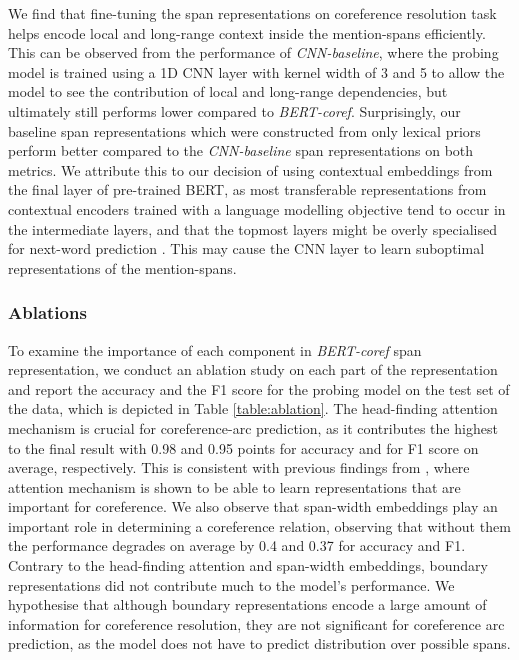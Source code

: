 \documentclass[11pt]{article}
\begin{document}
We find that fine-tuning the span representations on coreference resolution task helps encode local and long-range context inside the mention-spans efficiently. This can be observed from the performance of \textit{CNN-baseline}, where the probing model is trained using a 1D CNN layer with kernel width of 3 and 5 to allow the model to see the contribution of local and long-range dependencies, but ultimately still performs lower compared to \textit{BERT-coref}. Surprisingly, our baseline span representations which were constructed from only lexical priors perform better compared to the \textit{CNN-baseline} span representations on both metrics. We attribute this to our decision of using contextual embeddings from the final layer of pre-trained BERT, as most transferable representations from contextual encoders trained with a language modelling objective tend to occur in the intermediate layers, and that the topmost layers might be overly specialised for next-word prediction \parencite{liu2019linguistic,peters2018elmo,peters-etal-2018-dissecting,blevins-etal-2018-deep,devlin2019bert}. This may cause the CNN layer to learn suboptimal representations of the mention-spans.

\subsubsection{Ablations}
To examine the importance of each component in \textit{BERT-coref} span representation, we conduct an ablation study on each part of the representation and report the accuracy and the F1 score for the probing model on the test set of the data, which is depicted in Table \ref{table:ablation}. The head-finding attention mechanism is crucial for coreference-arc prediction, as it contributes the highest to the final result with 0.98 and 0.95 points for accuracy and for F1 score on average, respectively. This is consistent with previous findings from \textcite{lee2017end}, where attention mechanism is shown to be able to learn representations that are important for coreference. We also observe that span-width embeddings play an important role in determining a coreference relation, observing that without them the performance degrades on average by 0.4 and 0.37 for accuracy and F1. Contrary to the head-finding attention and span-width embeddings, boundary representations did not contribute much to the model's performance. We hypothesise that although boundary representations encode a large amount of information for coreference resolution, they are not significant for coreference arc prediction, as the model does not have to predict distribution over possible spans.
\end{document}
